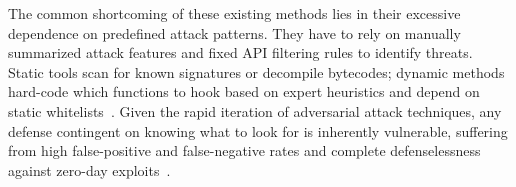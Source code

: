 The common shortcoming of these existing methods lies in their excessive dependence on predefined attack patterns. They have to rely on manually summarized attack features and fixed API filtering rules to identify threats.
Static tools scan for known signatures or decompile bytecodes; dynamic methods hard-code which functions to hook based on expert heuristics and depend on static whitelists~\cite{299852}. Given the rapid iteration of adversarial attack techniques, any defense contingent on knowing what to look for is inherently vulnerable, suffering from high false-positive and false-negative rates and complete defenselessness against zero-day exploits~\cite{GUO2023175, aghakhani}.





